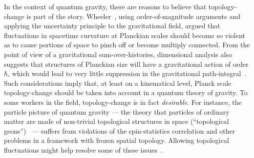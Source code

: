 \documentclass[12pt]{article}
\newcommand{\be}{\begin{equation}}
\newcommand{\ee}{\end{equation}}
\begin{document}
In the context of quantum gravity, there are reasons to believe that topology-change is part of the story. Wheeler~\cite{Wheeler1957604}, using order-of-magnitude arguments and applying the uncertainty principle to the gravitational field, argued that fluctuations in spacetime curvature at Planckian scales should become so violent as to cause portions of space to pinch off or become multiply connected. From the point of view of a gravitational sum-over-histories, dimensional analysis also suggests that  structures of Planckian size will have a gravitational action of order $\hbar$, which would lead to very little suppression in the gravitational path-integral~\cite{Sorkin:1997gi}. Such considerations imply that, at least on a kinematical level, Planck scale topology-change should be taken into account in a quantum theory of gravity.
To some workers in the field, topology-change is in fact \emph{desirable}. For instance, the particle picture of quantum gravity --- the theory that particles of ordinary matter are made of non-trivial topological structures in space (``topological geons'')~\cite{wheeler1955geons, Sorkin:1986geons} --- %
suffers from violations of the spin-statistics correlation and other problems in a framework with frozen spatial topology. Allowing topological fluctuations might help resolve some of these issues~\cite{Sorkin:1996yt,Sorkin:1989ea}.


\end{document}
